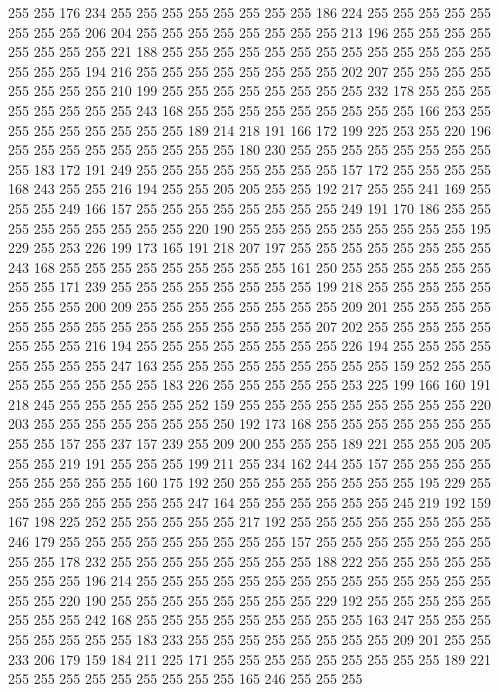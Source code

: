 255 255 176 234 255 255 255 255 255 255 255 255 186 224 255 255 255 255 255 255
255 255 206 204 255 255 255 255 255 255 255 255 213 196 255 255 255 255 255 255
255 255 221 188 255 255 255 255 255 255 255 255 255 255 255 255 255 255 255 255
194 216 255 255 255 255 255 255 255 255 202 207 255 255 255 255 255 255 255 255
210 199 255 255 255 255 255 255 255 255 232 178 255 255 255 255 255 255 255 255
243 168 255 255 255 255 255 255 255 255 255 166 253 255 255 255 255 255 255 255
255 189 214 218 191 166 172 199 225 253 255 220 196 255 255 255 255 255 255 255
255 255 180 230 255 255 255 255 255 255 255 255 255 183 172 191 249 255 255 255
255 255 255 255 255 157 172 255 255 255 255 168 243 255 255 216 194 255 255 205
205 255 255 192 217 255 255 241 169 255 255 255 249 166 157 255 255 255 255 255
255 255 255 249 191 170 186 255 255 255 255 255 255 255 255 255 220 190 255 255
255 255 255 255 255 255 255 195 229 255 253 226 199 173 165 191 218 207 197 255
255 255 255 255 255 255 255 243 168 255 255 255 255 255 255 255 255 255 161 250
255 255 255 255 255 255 255 255 171 239 255 255 255 255 255 255 255 255 199 218
255 255 255 255 255 255 255 255 200 209 255 255 255 255 255 255 255 255 209 201
255 255 255 255 255 255 255 255 255 255 255 255 255 255 255 255 207 202 255 255
255 255 255 255 255 255 216 194 255 255 255 255 255 255 255 255 226 194 255 255
255 255 255 255 255 255 247 163 255 255 255 255 255 255 255 255 255 159 252 255
255 255 255 255 255 255 255 183 226 255 255 255 255 255 253 225 199 166 160 191
218 245 255 255 255 255 255 252 159 255 255 255 255 255 255 255 255 255 220 203
255 255 255 255 255 255 255 250 192 173 168 255 255 255 255 255 255 255 255 255
157 255 237 157 239 255 209 200 255 255 255 189 221 255 255 205 205 255 255 219
191 255 255 255 199 211 255 234 162 244 255 157 255 255 255 255 255 255 255 255
255 160 175 192 250 255 255 255 255 255 255 255 195 229 255 255 255 255 255 255
255 255 247 164 255 255 255 255 255 255 245 219 192 159 167 198 225 252 255 255
255 255 255 217 192 255 255 255 255 255 255 255 255 246 179 255 255 255 255 255
255 255 255 255 157 255 255 255 255 255 255 255 255 255 178 232 255 255 255 255
255 255 255 255 188 222 255 255 255 255 255 255 255 255 196 214 255 255 255 255
255 255 255 255 255 255 255 255 255 255 255 255 220 190 255 255 255 255 255 255
255 255 229 192 255 255 255 255 255 255 255 255 242 168 255 255 255 255 255 255
255 255 255 163 247 255 255 255 255 255 255 255 255 183 233 255 255 255 255 255
255 255 255 209 201 255 255 233 206 179 159 184 211 225 171 255 255 255 255 255
255 255 255 255 189 221 255 255 255 255 255 255 255 255 255 165 246 255 255 255

